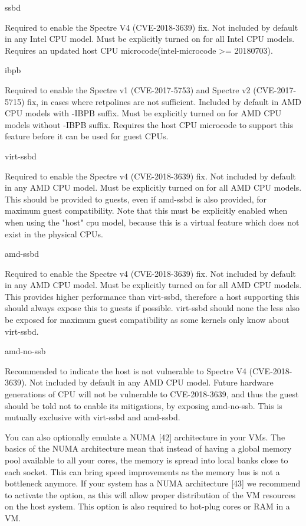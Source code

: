 ssbd

Required to enable the Spectre V4 (CVE-2018-3639) fix. Not included by default in any Intel CPU model. Must be explicitly turned on for all Intel CPU models. Requires an updated host CPU microcode(intel-microcode >= 20180703).

ibpb

Required to enable the Spectre v1 (CVE-2017-5753) and Spectre v2 (CVE-2017-5715) fix, in cases where retpolines are not sufficient. Included by default in AMD CPU models with -IBPB suffix. Must be explicitly turned on for AMD CPU models without -IBPB suffix. Requires the host CPU microcode to support this feature before it can be used for guest CPUs.

virt-ssbd

Required to enable the Spectre v4 (CVE-2018-3639) fix. Not included by default in any AMD CPU model. Must be explicitly turned on for all AMD CPU models. This should be provided to guests, even if amd-ssbd is also provided, for maximum guest compatibility. Note that this must be explicitly enabled when when using the "host" cpu model, because this is a virtual feature which does not exist in the physical CPUs.

amd-ssbd

Required to enable the Spectre v4 (CVE-2018-3639) fix. Not included by default in any AMD CPU model. Must be explicitly turned on for all AMD CPU models. This provides higher performance than virt-ssbd, therefore a host supporting this should always expose this to guests if possible. virt-ssbd should none the less also be exposed for maximum guest compatibility as some kernels only know about virt-ssbd.

amd-no-ssb

Recommended to indicate the host is not vulnerable to Spectre V4 (CVE-2018-3639). Not included by default in any AMD CPU model. Future hardware generations of CPU will not be vulnerable to CVE-2018-3639, and thus the guest should be told not to enable its mitigations, by exposing amd-no-ssb. This is mutually exclusive with virt-ssbd and amd-ssbd.

You can also optionally emulate a NUMA [42] architecture in your VMs. The basics of the NUMA architecture mean that instead of having a global memory pool available to all your cores, the memory is spread into local banks close to each socket. This can bring speed improvements as the memory bus is not a bottleneck anymore. If your system has a NUMA architecture [43] we recommend to activate the option, as this will allow proper distribution of the VM resources on the host system. This option is also required to hot-plug cores or RAM in a VM.

